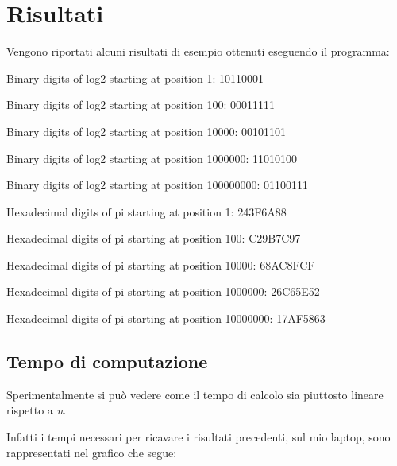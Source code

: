 \section{Risultati}
Vengono riportati alcuni risultati di esempio ottenuti eseguendo il programma:
\newline \newline

Binary digits of log2 starting at position 1: 10110001

Binary digits of log2 starting at position 100: 00011111

Binary digits of log2 starting at position 10000: 00101101

Binary digits of log2 starting at position 1000000: 11010100

Binary digits of log2 starting at position 100000000: 01100111
\newline \newline

Hexadecimal digits of pi starting at position 1: 243F6A88

Hexadecimal digits of pi starting at position 100: C29B7C97

Hexadecimal digits of pi starting at position 10000: 68AC8FCF

Hexadecimal digits of pi starting at position 1000000: 26C65E52

Hexadecimal digits of pi starting at position 10000000: 17AF5863

\subsection{Tempo di computazione}
Sperimentalmente si può vedere come il tempo di calcolo sia piuttosto lineare rispetto a \textit{n}.

Infatti i tempi necessari per ricavare i risultati precedenti, sul mio laptop, sono rappresentati nel grafico che segue:


